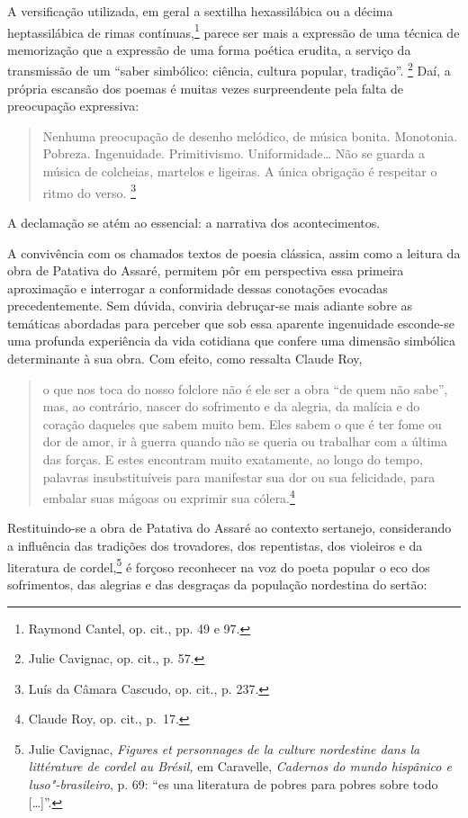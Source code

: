 \noindent A versificação utilizada, em geral a sextilha
hexassilábica ou a décima heptassilábica de rimas contínuas,\footnote{ Raymond
Cantel, op. cit., pp. 49 e 97.} parece ser mais a expressão de uma
técnica de memorização que a expressão de uma forma poética erudita, a serviço
da transmissão de um “saber simbólico: ciência, cultura popular, tradição”.
\footnote{ Julie Cavignac, op. cit., p. 57.} Daí, a própria escansão dos
poemas é muitas vezes surpreendente pela falta de preocupação expressiva:

\begin{quote}
Nenhuma preocupação de desenho melódico, de música bonita. Monotonia. Pobreza.
Ingenuidade. Primitivismo. Uniformidade\ldots{} Não se guarda a música de
colcheias, martelos e ligeiras. A única obrigação é respeitar o ritmo do verso.
\footnote{ Luís da Câmara Cascudo, op. cit., p. 237.}
\end{quote}

\noindent A declamação se
atém ao essencial: a narrativa dos acontecimentos.

A convivência com os chamados textos de poesia clássica, assim como a leitura da
obra de Patativa do Assaré, permitem pôr em perspectiva essa primeira aproximação
e interrogar a conformidade dessas conotações evocadas precedentemente. Sem
dúvida, conviria debruçar-se mais adiante sobre as temáticas abordadas para
perceber que sob essa aparente ingenuidade esconde-se uma profunda experiência
da vida cotidiana que confere uma dimensão simbólica determinante à sua obra.
Com efeito, como ressalta Claude Roy, 

\begin{quote}
o que nos toca do nosso folclore não é
ele ser a obra ``de quem não sabe'', mas, ao contrário, nascer do sofrimento e da
alegria, da malícia e do coração daqueles que sabem muito bem. Eles sabem o que
é ter fome ou dor de amor, ir à guerra quando não se queria ou trabalhar com a
última das forças. E estes encontram muito exatamente, ao longo do tempo,
palavras insubstituíveis para manifestar sua dor ou sua felicidade, para embalar
suas mágoas ou exprimir sua cólera.\footnote{ Claude Roy, op. cit., p.~17.}
\end{quote}

\noindent Restituindo-se a obra de Patativa do Assaré ao contexto sertanejo,
considerando a influência das tradições dos trovadores, dos repentistas, dos
violeiros e da literatura de cordel,\footnote{ Julie Cavignac, \textit{Figures et
personnages de la culture nordestine dans la littérature de cordel au
Brésil,} em Caravelle, \textit{Cadernos do mundo hispânico e luso"-brasileiro},
p. 69: “es una literatura de pobres para pobres sobre todo [\ldots{}]”.} é
forçoso reconhecer na voz do poeta popular o eco dos sofrimentos, das alegrias e
das desgraças da população nordestina do sertão:


